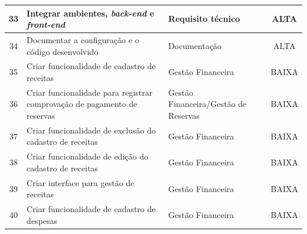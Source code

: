 \documentclass[
	12pt,				%
	openany,			%
	twoside,			%
	a4paper,			%
	english,			%
	french,				%
	spanish,			%
	brazil				%
	]{abntex2}
\begin{document}
\begin{quadro}[H]
\begin{tabular}{|c|p{6.5cm}|p{3.8cm}|c|}
		33 & Integrar ambientes, \textit{back-end} e \textit {front-end} &	Requisito técnico & ALTA \\ \hline
		34 & Documentar a configuração e o código desenvolvido &
		Documentação & ALTA \\ \hline
		35 & Criar funcionalidade de cadastro de receitas &	Gestão Financeira & BAIXA \\ \hline
		36 & Criar funcionalidade para registrar comprovação de pagamento de reservas &	Gestão Financeira/Gestão de Reservas &
		BAIXA \\ \hline
		37 & Criar funcionalidade de exclusão do cadastro de receitas &
		Gestão Financeira &	BAIXA \\ \hline
		38 & Criar funcionalidade de edição do cadastro de receitas &
		Gestão Financeira &	BAIXA \\ \hline
		39 & Criar interface para gestão de receitas & Gestão Financeira & BAIXA \\ \hline
		40 & Criar funcionalidade de cadastro de despesas &
		Gestão Financeira & BAIXA \\ \hline
		
	\end{tabular}
     \end{quadro}
     
\end{document}
